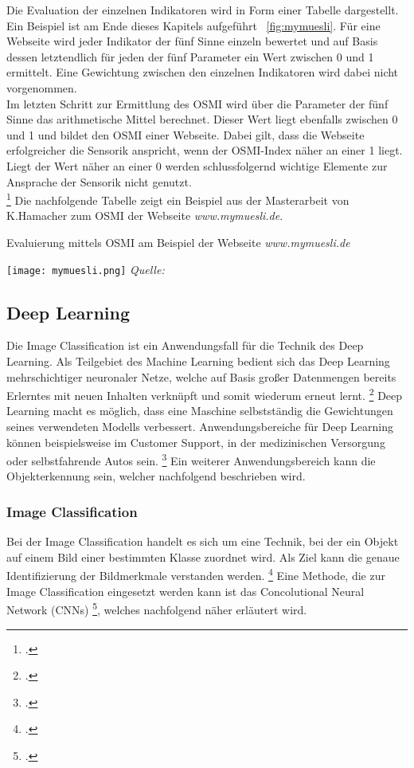 Die Evaluation der einzelnen Indikatoren wird in Form einer Tabelle dargestellt. Ein Beispiel ist am Ende dieses Kapitels aufgeführt ~\ref{fig:mymuesli}.
Für eine Webseite wird jeder Indikator der fünf Sinne einzeln bewertet und auf Basis dessen letztendlich für jeden der fünf Parameter ein Wert zwischen 0 und 1 ermittelt.
Eine Gewichtung zwischen den einzelnen Indikatoren wird dabei nicht vorgenommen. \\
Im letzten Schritt zur Ermittlung des \ac{OSMI} wird über die Parameter der fünf Sinne das arithmetische Mittel berechnet.
Dieser Wert liegt ebenfalls zwischen 0 und 1 und bildet den \ac{OSMI} einer Webseite. Dabei gilt, dass die Webseite erfolgreicher die Sensorik anspricht, wenn der OSMI-Index näher an einer 1 liegt.
Liegt der Wert näher an einer 0 werden schlussfolgernd wichtige Elemente zur Ansprache der Sensorik nicht genutzt. \\ \footcite[\vglf][ \& 58]{hamacher2018}
Die nachfolgende Tabelle zeigt ein Beispiel aus der Masterarbeit von K.Hamacher zum \ac{OSMI} der Webseite \textit{www.mymuesli.de}.

\begin{table}[H]
    \caption{Evaluierung mittels \ac{OSMI} am Beispiel der Webseite \textit{www.mymuesli.de}}\label{fig:mymuesli}
    \texttt{[image: mymuesli.png]}
    \textit{Quelle:~\cite[][]{hamacher2018}}
\end{table}

\subsection{Deep Learning}

Die Image Classification ist ein Anwendungsfall für die Technik des Deep Learning.
Als Teilgebiet des Machine Learning bedient sich das Deep Learning mehrschichtiger neuronaler Netze, welche auf Basis großer Datenmengen bereits Erlerntes mit neuen Inhalten verknüpft und somit wiederum erneut lernt. \footcite[\vglf][ \& 3]{plaat2022}
Deep Learning macht es möglich, dass eine Maschine selbstständig die Gewichtungen seines verwendeten Modells verbessert.
Anwendungsbereiche für Deep Learning können beispielsweise im Customer Support, in der medizinischen Versorgung oder selbstfahrende Autos sein. \footcite[\vglf][ \& 511]{handa2021}
Ein weiterer Anwendungsbereich kann die Objekterkennung sein, welcher nachfolgend beschrieben wird.

\subsubsection{Image Classification}\label{sec_grundlagen_image_classification}
Bei der Image Classification handelt es sich um eine Technik, bei der ein Objekt auf einem Bild einer bestimmten Klasse zuordnet wird. Als Ziel kann die genaue Identifizierung der Bildmerkmale verstanden werden. \footcite[\vglf][]{internationalconferenceoncomputercommunicationandinformatics2021}
Eine Methode, die zur Image Classification eingesetzt werden kann ist das Concolutional Neural Network (\acp{CNN}) \footcite[\vglf][]{internationalconferenceonadvancesinelectronics2018}, welches nachfolgend näher erläutert wird.

